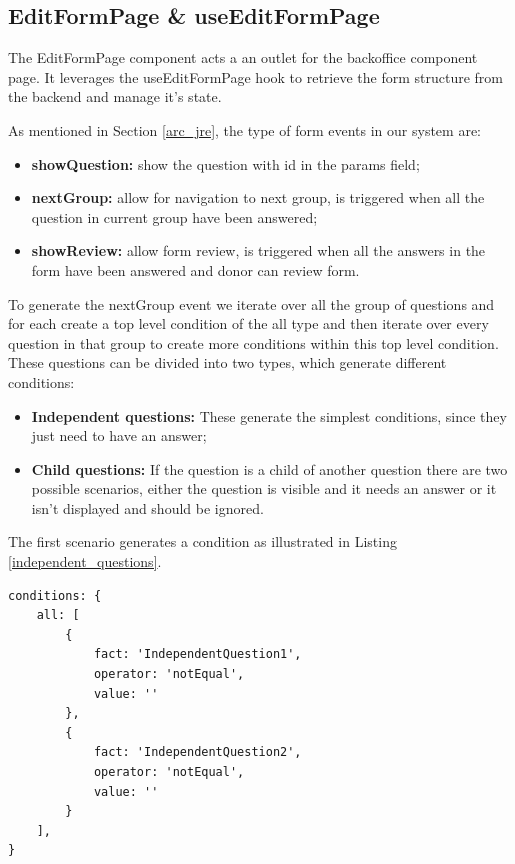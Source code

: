 \newpage

\subsection{EditFormPage \& useEditFormPage}
The EditFormPage component acts a an outlet for the backoffice component page. It leverages the useEditFormPage hook to retrieve the form structure from the backend and manage it's state.

As mentioned in Section \ref{arc_jre}, the type of form events in our system are:
\begin{itemize}
	\item \textbf{showQuestion:} show the question with id in the params field;
	\item \textbf{nextGroup:} allow for navigation to next group, is triggered when all the question in current group have been answered;
	\item \textbf{showReview:} allow form review, is triggered when all the answers in the form have been answered and donor can review form.
\end{itemize}

To generate the nextGroup event we iterate over all the group of questions and for each create a top level condition of the all type and then iterate over every question in that group to create more conditions within this top level condition.
These questions can be divided into two types, which generate different conditions:
\begin{itemize}
	\item \textbf{Independent questions:} These generate the simplest conditions, since they just need to have an answer;
	\item \textbf{Child questions:} If the question is a child of another question there are two possible scenarios, either the question is visible and it needs an answer or it isn't displayed and should be ignored. 
\end{itemize}

The first scenario generates a condition as illustrated in Listing \ref{independent_questions}.
\begin{lstlisting}[style=sharpc, caption={Condition generated by and independent questions}, label={independent_questions}]
conditions: {
	all: [
		{
			fact: 'IndependentQuestion1',
			operator: 'notEqual',
			value: ''
		},
		{
			fact: 'IndependentQuestion2',
			operator: 'notEqual',
			value: ''
		}
	],
}
\end{lstlisting}

